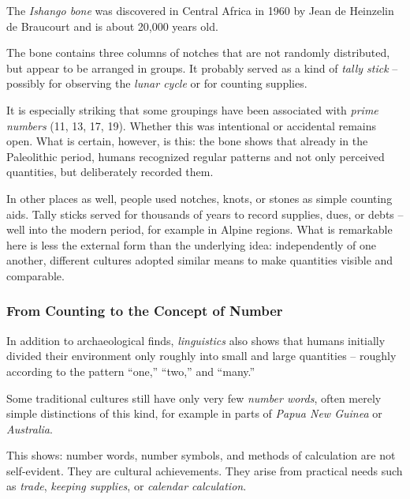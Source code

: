 \begin{HistoryBox}
	The \emph{Ishango bone} was discovered in Central Africa in 1960 by
	Jean de Heinzelin de Braucourt and is about 20,000 years old.
	
	The bone contains three columns of notches
	that are not randomly distributed, but appear to be arranged in groups.
	It probably served as a kind of \emph{tally stick} --
	possibly for observing the \emph{lunar cycle}
	or for counting supplies.
	
	It is especially striking that some groupings have been associated with
	\emph{prime numbers}
	(11, 13, 17, 19).
	Whether this was intentional or accidental remains open.
	What is certain, however, is this:
	the bone shows that already in the Paleolithic period,
	humans recognized regular patterns and not only perceived quantities,
	but deliberately recorded them.
	\label{box:ishango}
\end{HistoryBox}

In other places as well, people used notches, knots, or stones as simple counting aids.
Tally sticks served for thousands of years to record supplies, dues, or debts --
well into the modern period, for example in Alpine regions.
What is remarkable here is less the external form than the underlying idea:
independently of one another, different cultures adopted similar means
to make quantities visible and comparable.

\subsubsection*{From Counting to the Concept of Number}
In addition to archaeological finds, \emph{linguistics}
also shows that humans initially divided their environment only roughly
into small and large quantities --
roughly according to the pattern ``one,'' ``two,'' and ``many.''

Some traditional cultures still have only very few
\emph{number words},
often merely simple distinctions of this kind,
for example in parts of \emph{Papua New Guinea}
or \emph{Australia}.

This shows:
number words, number symbols, and methods of calculation are not self-evident.
They are cultural achievements.
They arise from practical needs such as
\emph{trade},
\emph{keeping supplies},
or \emph{calendar calculation}.

